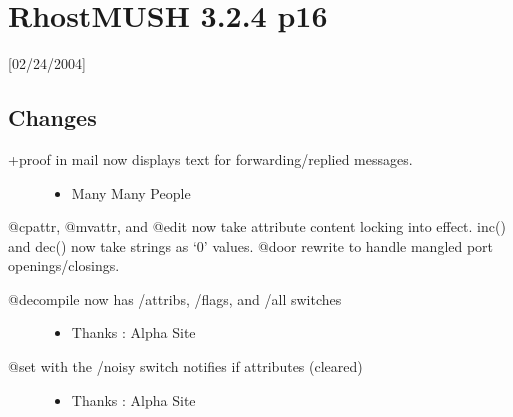 \documentclass[letterpaper,10pt,english]{sphinxmanual}
\begin{document}
\section{RhostMUSH 3.2.4 p16}
\label{\detokenize{changelog:rhostmush-3-2-4-p16}}\label{\detokenize{changelog:changelog-3-2-4p16}}
\sphinxAtStartPar
{[}02/24/2004{]}


\subsection{Changes}
\label{\detokenize{changelog:id6}}\begin{description}
\item[{+proof in mail now displays text for forwarding/replied messages.}] \leavevmode\begin{itemize}
\item {} 
\sphinxAtStartPar
Many Many People

\end{itemize}

\end{description}

\sphinxAtStartPar
@cpattr, @mvattr, and @edit now take attribute content locking into effect.
inc() and dec() now take strings as ‘0’ values.
@door rewrite to handle mangled port openings/closings.
\begin{description}
\item[{@decompile now has /attribs, /flags, and /all switches}] \leavevmode\begin{itemize}
\item {} 
\sphinxAtStartPar
Thanks : Alpha Site

\end{itemize}

\item[{@set with the /noisy switch notifies if attributes (cleared)}] \leavevmode\begin{itemize}
\item {} 
\sphinxAtStartPar
Thanks : Alpha Site

\end{itemize}

\end{description}
\end{document}
